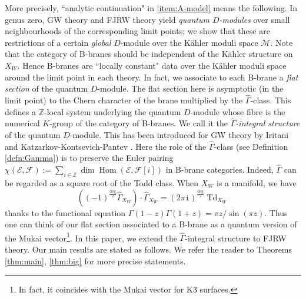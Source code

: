 \documentclass[11pt]{amsart}
\theoremstyle{definition} %
\theoremstyle{remark} %
\newcommand{\ZZ}{\mathbb Z}
\newcommand{\Hom}{\operatorname{Hom}}
\newcommand{\cM}{\mathcal{M}}
\newcommand{\cE}{\mathcal{E}}
\newcommand{\cF}{\mathcal{F}}
\newcommand{\Todd}{\operatorname{Td}}
\newcommand{\hGamma}{\widehat{\Gamma}}
\newcommand{\iu}{\mathtt{i}}
\begin{document}
More precisely, ``analytic continuation"  
in \eqref{item:A-model} means the following. 
In genus zero, GW theory and FJRW theory 
yield \emph{quantum $D$-modules} 
over small neighbourhoods of the corresponding limit points; 
we show that these are restrictions of a certain \emph{global} 
$D$-module over the K\"{a}hler moduli space $\cM$. 
Note that the category of B-branes 
should be independent of the K\"{a}hler structure on $X_W$. 
Hence B-branes are ``locally constant" data 
over the K\"{a}hler moduli space 
around the limit point in each theory. 
In fact, we associate to each B-brane 
a \emph{flat section} of the quantum $D$-module. 
The flat section here is asymptotic (in the limit point)  
to the Chern character of the brane multiplied 
by the $\hGamma$-class. 
This defines a $\ZZ$-local system 
underlying the quantum $D$-module 
whose fibre is the numerical $K$-group 
of the category of B-branes. We call it  
the \emph{$\hGamma$-integral structure} of the 
quantum $D$-module. 
This has been introduced for GW theory 
by Iritani \cite{Ir} and Katzarkov-Kontsevich-Pantev \cite{KKP}. 
Here the role of the $\hGamma$-class (see Definition 
\ref{defn:Gamma}) is to preserve the Euler pairing 
$\chi(\cE,\cF) := \sum_{i\in \ZZ} \dim \Hom(\cE,\cF[i])$ 
in B-brane categories. 
Indeed, $\hGamma$ can be regarded 
as a square root of the Todd class. When $X_W$ is a manifold, 
we have 
\[
\left( (-1)^{\frac\deg 2} \hGamma_{X_W} \right) \cdot \hGamma_{X_W} 
=  (2\pi\iu)^{\frac\deg 2} \Todd_{X_W}  
\]
thanks to the functional equation 
$\Gamma(1-z) \Gamma(1+z) = \pi z/\sin(\pi z)$. 
Thus one can think of our flat section associated to a B-brane 
as a quantum version of the Mukai vector\footnote 
{In fact, it coincides with the Mukai vector for K3 surfaces.}.  
In this paper, we extend the $\hGamma$-integral structure 
to FJRW theory. 
Our main results are stated as follows. 
We refer the reader to Theorems \ref{thm:main}, \ref{thm:big} 
for more precise statements.  
\end{document}

